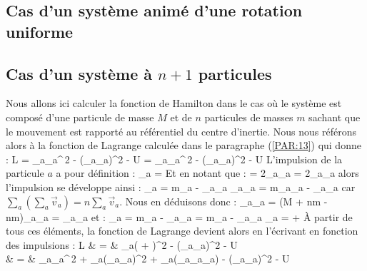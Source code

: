 \subsection{Cas d'un syst\`{e}me anim\'{e} d'une rotation uniforme}\label{PAR:40_EX4}

\subsection{Cas d'un syst\`{e}me \`{a} $n+1$ particules}\label{PAR:40_EX5}

Nous allons ici calculer la fonction de Hamilton dans le cas o\`{u} le syst\`{e}me est compos\'{e} d'une particule de masse $M$ et de $n$ particules de masses $m$ sachant que le mouvement est rapport\'{e} au r\'{e}f\'{e}rentiel du centre d'inertie. Nous nous r\'{e}f\'{e}rons alors \`{a} la fonction de Lagrange calcul\'{e}e dans le paragraphe (\ref{PAR:13}) qui donne :
\benn
	L = \sum_{a}_{a}^{\,2} - \left(\sum_{a}_{a}\right)^{2} - U = \sum_{a}_{a}^{\,2} - \left(\sum_{a}_{a}\right)^{2} - U
\eenn
L'impulsion de la particule $a$ a pour d\'{e}finition :
\benn
	_{a} = 
\eenn
Et en notant que :
\benn
	 = 2\sum_{a}_{a}\times{} = 2\sum_{a}_{a}
\eenn
alors l'impulsion se d\'{e}veloppe ainsi :
\benn
	_{a} = m_{a} - \sum_{a}_{a} \Rightarrow \sum_{a}_{a} = m\sum_{a}_{a} - \sum_{a}_{a}
\eenn
car $\sum_{a}(\sum_{a}\vec{v}_{a}) = n\sum_{a}\vec{v}_{a}$. Nous en d\'{e}duisons donc :
\benn
	\sum_{a}_{a} = (M + nm - nm)\sum_{a}_{a} = \sum_{a}_{a}
\eenn
et :
\benn
	_{a} = m_{a} - \sum_{a}_{a} = m_{a} - \sum_{a}_{a} \Leftrightarrow {}_{a} =  + 
\eenn
\`{A} partir de tous ces \'{e}l\'{e}ments, la fonction de Lagrange devient alors en l'\'{e}crivant en fonction des impulsions :
\bea
	L & = & \sum_{a}\left( + \right)^{2} - \left(\sum_{a}_{a}\right)^{2} - U \nonumber \\
	& = & \sum_{a}_{a}^{\,2} + \sum_{a}(\sum_{a}_{a})^{2} + \sum_{a}(_{a}\sum_{a}_{a}) - (\sum_{a}_{a})^{2} - U \nonumber \\
